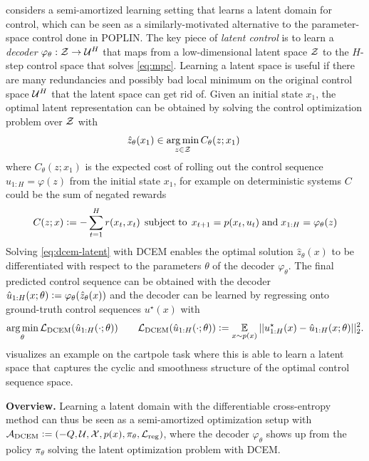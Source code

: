 \documentclass[twoside,11pt]{article}
\begin{document}
\citet{amos2019dcem} considers a semi-amortized learning setting
that learns a latent domain for control, which can be seen as
a similarly-motivated alternative to the parameter-space
control done in POPLIN.
The key piece of \emph{latent control}
is to learn a \emph{decoder} $\varphi_\theta:{\mathcal{Z}}\rightarrow {\mathcal{U}}^H$
that maps from a low-dimensional latent space ${\mathcal{Z}}$ to the
$H$-step control space that solves \cref{eq:mpc}.
Learning a latent space is useful if there are many redundancies
and possibly bad local minimum on the original control space
${\mathcal{U}}^H$ that the latent space can get rid of.
Given an initial state $x_1$, the optimal latent representation
can be obtained by solving the control optimization problem
over ${\mathcal{Z}}$ with
\begin{equation}
  \hat z_\theta(x_1)\in \operatorname*{arg\,min}_{z\in{\mathcal{Z}}} C_\theta(z; x_1)\;
  \label{eq:dcem-latent}
\end{equation}
where $C_\theta(z; x_1)$ is the expected cost of rolling out the
control sequence $u_{1:H}=\varphi(z)$ from the initial state
$x_1$, for example on deterministic systems $C$
could be the sum of negated rewards
\begin{equation}
  C(z; x) \vcentcolon= -\sum_{t=1}^H r(x_t, x_t)\;
  \operatorname*{subject\;to}\;x_{t+1}=p(x_t, u_t)\; {\rm and}\; x_{1:H}=\varphi_\theta(z)
  \label{eq:latent-cost}
\end{equation}
Solving \cref{eq:dcem-latent} with DCEM enables the optimal
solution $\hat z_\theta(x)$ to be differentiated with respect
to the parameters $\theta$ of the decoder $\varphi_\theta$.
The final predicted control sequence can be
obtained with the decoder
$\hat u_{1:H}(x; \theta)\vcentcolon= \varphi_\theta(\hat z_\theta(x))$
and the decoder can be learned by regressing
onto ground-truth control sequences $u^\star(x)$ with
\begin{equation}
  \operatorname*{arg\,min}_\theta {\mathcal{L}}_{\rm DCEM}(\hat u_{1:H}(\cdot; \theta)) \qquad {\mathcal{L}}_{\rm DCEM}(\hat u_{1:H}(\cdot; \theta))\vcentcolon= \operatorname*{\mathbb{E}}_{x \sim p(x)}
  ||u^\star_{1:H}(x) - \hat u_{1:H}(x; \theta)||_2^2.
\label{eq:dcem-loss}
\end{equation}
 visualizes an example on the cartpole task
where this is able to learn a latent space that captures the
cyclic and smoothness structure of the optimal control
sequence space.

\textbf{Overview.} Learning a latent domain with the
differentiable cross-entropy method can thus be seen
as a semi-amortized optimization setup with
${\mathcal{A}}_{\rm DCEM}\vcentcolon= (-Q, {\mathcal{U}}, {\mathcal{X}}, p(x), \pi_\theta, {\mathcal{L}}_{\rm reg})$,
where the decoder $\varphi_\theta$ shows up from
the policy $\pi_\theta$ solving the latent
optimization problem with DCEM.
\end{document}
